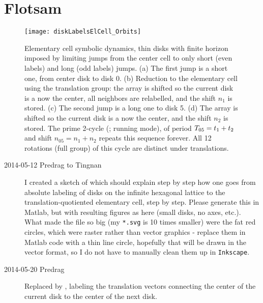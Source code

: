 \section{Flotsam}

\begin{figure}
\begin{center}
\texttt{[image: diskLabelsElCell\_Orbits]}
\end{center}
\caption{
Elementary cell symbolic dynamics, thin disks with  finite horizon
imposed by limiting jumps from the center cell to only short (even
labels) and long (odd labels) jumps.
(a) The first jump is a short one, from center disk to disk 0.
(b) Reduction to the elementary cell using the translation group:
the array is shifted so the current disk is a now the
center, all neighbors are relabelled, and the shift $n_1$
is stored.
(c) The second jump is a long one to disk 5.
(d) The array is shifted so the current disk is a now the center, and the
shift $n_2$ is stored. The prime 2-cycle  (\rpo; running mode),
of period ${T_{05}}=t_1+t_2$ and shift $n_{05} = n_1+n_2$
repeats this sequence forever. All 12 rotations (full  group) of
this cycle are distinct under translations.
    }
\label{diskLabelsElCell}
\end{figure}




\begin{description}

\item[2014-05-12 Predrag to Tingnan]
I created a sketch of  which should explain step
by step how one goes from absolute labeling of disks on the infinite
hexagonal lattice to the translation-quotiented elementary cell, step by
step. Please generate this in Matlab, but with resulting figures as here
(small disks, no axes, etc.). What made the file so big (my
\texttt{*.svg} is 10 times smaller) were the fat red circles, which were
raster rather than vector graphics - replace them in Matlab code with a
thin line circle, hopefully that will be drawn in the vector format, so I
do not have to manually clean them up in \texttt{Inkscape}.

\item[2014-05-20 Predrag]
Replaced  by ,
labeling the translation vectors connecting the center of the current
disk to the center of the next disk.

\end{description}

